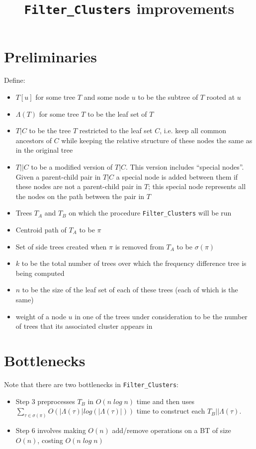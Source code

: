 \documentclass[a4paper]{article}
\title{\texttt{Filter\_Clusters} improvements}
\begin{document}
    \maketitle

    \section{Preliminaries}
    Define:
    \begin{itemize}
        \item $T[u]$ for some tree $T$ and some node $u$ to be the subtree of $T$ rooted at $u$
        \item $\Lambda(T)$ for some tree $T$ to be the leaf set of $T$
        \item $T|C$ to be the tree $T$ restricted to the leaf set $C$, i.e. keep all common ancestors of $C$ while keeping the relative structure of these nodes the same as in the original tree
        \item $T||C$ to be a modified version of $T|C$. This version includes ``special nodes''. Given a parent-child pair in $T|C$ a special node is added between them if these nodes are not a parent-child pair in $T$; this special node represents all the nodes on the path between the pair in $T$
        \item Trees $T_A$ and $T_B$ on which the procedure \texttt{Filter\_Clusters} will be run
        \item Centroid path of $T_A$ to be $\pi$
        \item Set of side trees created when $\pi$ is removed from $T_A$ to be $\sigma(\pi)$
        \item $k$ to be the total number of trees over which the frequency difference tree is being computed
        \item $n$ to be the size of the leaf set of each of these trees (each of which is the same)
        \item weight of a node $u$ in one of the trees under consideration to be the number of trees that its associated cluster appears in
    \end{itemize}

    \section{Bottlenecks}

    Note that there are two bottlenecks in \texttt{Filter\_Clusters}:
    \begin{itemize}
        \item Step 3 preprocesses $T_B$ in $O(n\;log\;n)$ time and then uses $\sum_{\tau\in\sigma(\pi)}O(|\Lambda(\tau)|log(|\Lambda(\tau)|))$ time to construct each $T_B||\Lambda(\tau)$.

        \item Step 6 involves making $O(n)$ add/remove operations on a BT of size $O(n)$, costing $O(n\;log\;n)$
    \end{itemize}
\end{document}
